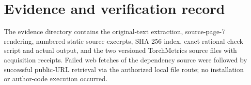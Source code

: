 \documentclass[10pt]{article}
\begin{document}
\section*{Evidence and verification record}
The evidence directory contains the original-text extraction, source-page-7 rendering, numbered static source excerpts, SHA-256 index, exact-rational check script and actual output, and the two versioned TorchMetrics source files with acquisition receipts. Failed web fetches of the dependency source were followed by successful public-URL retrieval via the authorized local file route; no installation or author-code execution occurred.\par
\end{document}
